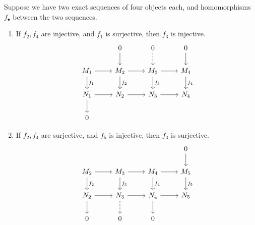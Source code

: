 \begin{lemma}\label{lem:four}
    Suppose we have two exact sequences of four objects each,
    and homomorphisms \(f_\bullet\) between the two sequences.
    \begin{enumerate}[label={(\alph*)}, itemsep=0mm]
        \item If \(f_2,f_4\) are injective, and \(f_1\) is surjective,
            then \(f_3\) is injective.
            \begin{equation*}
                \begin{tikzcd}
                    & 0 \arrow{d} & 0 \arrow[dashrightarrow]{d} & 0 \arrow{d} \\
                    M_1 \arrow{r} \arrow{d}{f_1} & M_2 \arrow{r} \arrow{d}{f_2} &
                    M_3 \arrow{r} \arrow{d}{f_3} & M_4 \arrow{d}{f_4} \\
                    N_1 \arrow{r} \arrow{d} & N_2 \arrow{r} & N_3 \arrow{r} & N_4 \\
                    0
                \end{tikzcd}
            \end{equation*}
        \item If \(f_2,f_4\) are surjective, and \(f_5\) is injective,
            then \(f_3\) is surjective.
            \begin{equation*}
                \begin{tikzcd}
                    & & & 0 \arrow{d} \\
                    M_2 \arrow{r} \arrow{d}{f_2} & M_3 \arrow{r} \arrow{d}{f_3} &
                    M_4 \arrow{d}{f_4} \arrow{r} & M_5 \arrow{d}{f_5} \\
                    N_2 \arrow{r} \arrow{d} & N_3 \arrow{r} \arrow[dashrightarrow]{d} &
                    N_4 \arrow{r} \arrow{d} & N_5 \\
                    0 & 0 & 0
                \end{tikzcd}
            \end{equation*}
    \end{enumerate}
\end{lemma}
